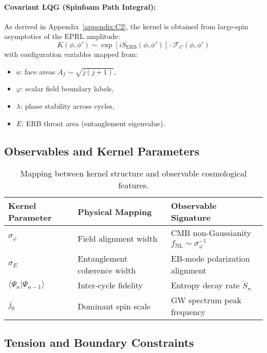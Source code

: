 \paragraph{Covariant LQG (Spinfoam Path Integral):}
As derived in Appendix~\ref{appendix:C2}, the kernel is obtained from large-spin asymptotics of the EPRL amplitude:
\[
K(\phi, \phi') \sim \exp\left[i S_{\text{ERB}}(\phi, \phi')\right] \cdot \mathcal{F}_C(\phi, \phi')
\]
with configuration variables mapped from:
\begin{itemize}
    \item \( a \): face areas \( A_f \sim \sqrt{j(j+1)} \),
    \item \( \varphi \): scalar field boundary labels,
    \item \( \lambda \): phase stability across cycles,
    \item \( E \): ERB throat area (entanglement eigenvalue).
\end{itemize}

\subsection{Observables and Kernel Parameters}
\label{subsec:observables-and-kernel-parameters}

\begin{table}[H]
\centering
\begin{tabular}{lll}
\toprule
\textbf{Kernel Parameter} & \textbf{Physical Mapping} & \textbf{Observable Signature} \\
\midrule
\( \sigma_\varphi \) & Field alignment width & CMB non-Gaussianity \( f_{\text{NL}} \sim \sigma_\varphi^{-1} \) \\
\( \sigma_E \) & Entanglement coherence width & EB-mode polarization alignment \\
\( \langle \Psi_n | \Psi_{n-1} \rangle \) & Inter-cycle fidelity & Entropy decay rate \( \dot{S}_n \) \\
\( j_0 \) & Dominant spin scale & GW spectrum peak frequency \\
\bottomrule
\end{tabular}
\caption{Mapping between kernel structure and observable cosmological features.}
\end{table}

\subsection{Tension and Boundary Constraints}
\label{subsec:tension-constraints}

